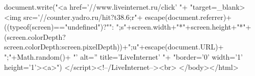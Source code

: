 document.write("<a href='//www.liveinternet.ru/click' "+
"target=_blank><img src='//counter.yadro.ru/hit?t38.6;r"+
escape(document.referrer)+((typeof(screen)=="undefined")?"":
";s"+screen.width+"*"+screen.height+"*"+(screen.colorDepth?
screen.colorDepth:screen.pixelDepth))+";u"+escape(document.URL)+
";"+Math.random()+
"' alt='' title='LiveInternet' "+
"border='0' width='1' height='1'><\/a>")
</script><!--/LiveInternet--><br> </body></html>